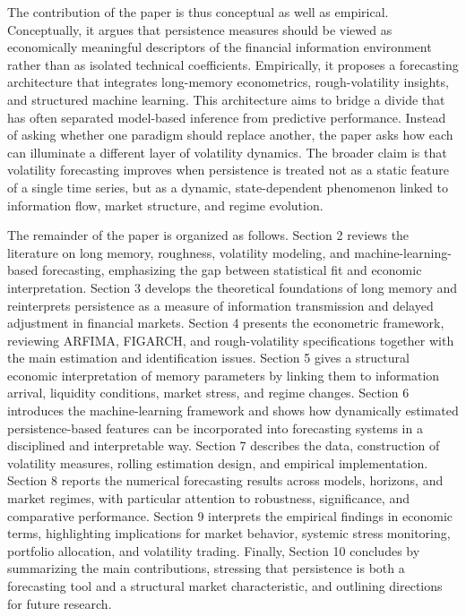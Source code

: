 \documentclass[12pt]{article}
\begin{document}
The contribution of the paper is thus conceptual as well as empirical. Conceptually, it argues that persistence measures should be viewed as economically meaningful descriptors of the financial information environment rather than as isolated technical coefficients. Empirically, it proposes a forecasting architecture that integrates long-memory econometrics, rough-volatility insights, and structured machine learning. This architecture aims to bridge a divide that has often separated model-based inference from predictive performance. Instead of asking whether one paradigm should replace another, the paper asks how each can illuminate a different layer of volatility dynamics. The broader claim is that volatility forecasting improves when persistence is treated not as a static feature of a single time series, but as a dynamic, state-dependent phenomenon linked to information flow, market structure, and regime evolution.

The remainder of the paper is organized as follows. Section 2 reviews the literature on long memory, roughness, volatility modeling, and machine-learning-based forecasting, emphasizing the gap between statistical fit and economic interpretation. Section 3 develops the theoretical foundations of long memory and reinterprets persistence as a measure of information transmission and delayed adjustment in financial markets. Section 4 presents the econometric framework, reviewing ARFIMA, FIGARCH, and rough-volatility specifications together with the main estimation and identification issues. Section 5 gives a structural economic interpretation of memory parameters by linking them to information arrival, liquidity conditions, market stress, and regime changes. Section 6 introduces the machine-learning framework and shows how dynamically estimated persistence-based features can be incorporated into forecasting systems in a disciplined and interpretable way. Section 7 describes the data, construction of volatility measures, rolling estimation design, and empirical implementation. Section 8 reports the numerical forecasting results across models, horizons, and market regimes, with particular attention to robustness, significance, and comparative performance. Section 9 interprets the empirical findings in economic terms, highlighting implications for market behavior, systemic stress monitoring, portfolio allocation, and volatility trading. Finally, Section 10 concludes by summarizing the main contributions, stressing that persistence is both a forecasting tool and a structural market characteristic, and outlining directions for future research.
\end{document}
